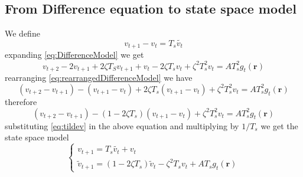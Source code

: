 \documentclass[a4paper,10pt]{article}
\begin{document}
\subsection*{From Difference equation to state space model}
We define
\begin{equation}\label{eq:tildev}
v_{t+1}-v_t=T_s\tilde{v_t}
\end{equation}
expanding \eqref{eq:DifferenceModel} we get
\begin{equation}\label{eq:rearrangedDifferenceModel}
 v_{t+2}-2v_{t+1}+2\zeta T_S v_{t+1}+v_t-2\zeta T_sv_t+\zeta^2T_s^2v_t=AT_s^2g_t\left( \mathbf{r}\right)
\end{equation}
rearranging \eqref{eq:rearrangedDifferenceModel} we have
\begin{equation}
(v_{t+2}-v_{t+1})-(v_{t+1}-v_t)+2\zeta T_s(v_{t+1}-v_t)+\zeta^2T_s^2v_t=AT_s^2g_t\left( \mathbf{r}\right)
\end{equation}
therefore
\begin{equation}
(v_{t+2}-v_{t+1})-(1-2\zeta T_s)(v_{t+1}-v_t)+\zeta^2T_s^2v_t=AT_s^2g_t\left( \mathbf{r}\right)
\end{equation}
substituting \eqref{eq:tildev} in the above equation and multiplying by $1/T_s$ we get the state space model
\begin{equation}\label{eq:StateSpaceModel}
\begin{cases}
v_{t+1}=T_s\tilde{v_t}+v_t\\
\tilde{v}_{t+1}=(1-2\zeta T_s)\tilde{v}_t-\zeta^2T_sv_t+AT_sg_t\left( \mathbf{r}\right)
\end{cases}
\end{equation}
\end{document}
